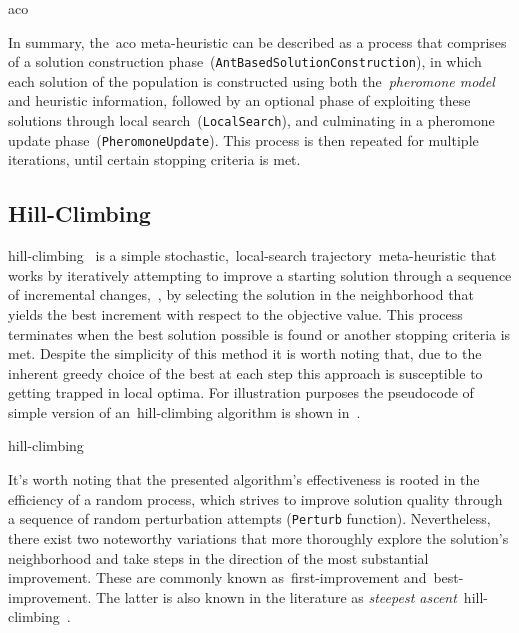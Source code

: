 \begin{algorithm}
  
  \caption{\acrlong{aco}}
  \label{algorithm:aco}
\end{algorithm}

In summary, the~\acrshort{aco} meta-heuristic can be described as a process that
comprises of a solution construction
phase~(\texttt{AntBasedSolutionConstruction}), in which each solution
of the population is constructed using both the~\textit{pheromone model} and
heuristic information, followed by an optional phase of exploiting these
solutions through local search~(\texttt{LocalSearch}), and culminating
in a pheromone update phase~(\texttt{PheromoneUpdate}). This process is
then repeated for multiple iterations, until certain stopping criteria is met.

\subsection{Hill-Climbing}
\label{subsec:hill-climbing}

\acrfull{hill-climbing}~\cite{luke2013essentialsa,vieira2009uma} is a simple
stochastic,~\acrshort{local-search} trajectory~\acrshort{meta-heuristic} that
works by iteratively attempting to improve a starting solution through a
sequence of incremental changes,~\ie{}, by selecting the solution in the
neighborhood that yields the best increment with respect to the objective value.
This process terminates when the best solution possible is found or another
stopping criteria is met. Despite the simplicity of this method it is worth
noting that, due to the inherent greedy choice of the best at each step this
approach is susceptible to getting trapped in local optima. For illustration
purposes the pseudocode of simple version of an~\acrshort{hill-climbing}
algorithm is shown in~.

\begin{algorithm}
  
  \caption{\acrlong{hill-climbing}}
  \label{algorithm:hill-climbing}
\end{algorithm}

It's worth noting that the presented algorithm's effectiveness is rooted in the
efficiency of a random process, which strives to improve solution quality
through a sequence of random perturbation attempts (\texttt{Perturb} function).
Nevertheless, there exist two noteworthy variations that more thoroughly explore
the solution's neighborhood and take steps in the direction of the most
substantial improvement. These are commonly known as~\acrfull{first-improvement}
and~\acrfull{best-improvement}. The latter is also known in the literature as
\textit{steepest ascent}~\acrshort{hill-climbing}~\cite{luke2013essentialsa}.

